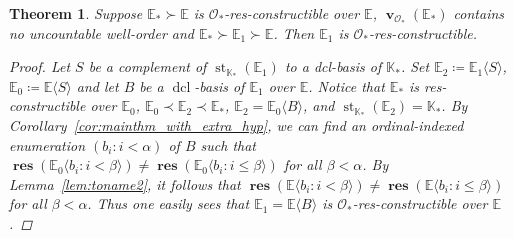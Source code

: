 \documentclass{amsart}
\newtheorem{theorem}{Theorem}
\theoremstyle{remark}
\theoremstyle{definition}
\theoremstyle{plain}
\newcommand{\bE}{\mathbb E}
\newcommand{\bK}{\mathbb K}
\newcommand{\cO}{\mathcal O}
\DeclareMathOperator{\val}{\mathbf{v}}
\DeclareMathOperator{\res}{\mathbf{res}}
\DeclareMathOperator{\std}{\mathrm{st}}
\DeclareMathOperator{\dcl}{\mathrm{dcl}}
\theoremstyle{plain}
\begin{document}
\begin{theorem}\label{thm:mainthm}
    Suppose $\bE_*\succ \bE$ is $\cO_*$-res-constructible over $\bE$, $\val_{\cO_*}(\bE_*)$ contains no uncountable well-order and $\bE_* \succ \bE_1 \succ \bE$. Then $\bE_1$ is $\cO_*$-res-constructible.
    \begin{proof}
        Let $S$ be a complement of $\std_{\bK_*}(\bE_1)$ to a dcl-basis of $\bK_*$. Set $\bE_2\coloneqq \bE_1\langle S\rangle$, $\bE_0\coloneqq \bE \langle S\rangle$ and let $B$ be a $\dcl$-basis of $\bE_1$ over $\bE$. 
        Notice that $\bE_*$ is res-constructible over $\bE_0$, $\bE_0 \prec \bE_2 \prec \bE_*$, $\bE_2=\bE_0 \langle B\rangle$, and $\std_{\bK_*}(\bE_2)=\bK_*$.
        By Corollary~\ref{cor:mainthm_with_extra_hyp}, we can find an ordinal-indexed enumeration $(b_i: i< \alpha)$ of $B$ such that $\res(\bE_0 \langle b_i: i< \beta \rangle)\neq \res(\bE_0 \langle b_i: i\le \beta\rangle)$ for all $\beta <\alpha$.
        By Lemma~\ref{lem:toname2}, it follows that $\res(\bE \langle b_i: i< \beta \rangle)\neq \res(\bE \langle b_i: i\le \beta\rangle)$ for all $\beta <\alpha$. Thus one easily sees that $\bE_1 = \bE \langle B \rangle$ is $\cO_*$-res-constructible over $\bE$.
    \end{proof}
\end{theorem}
\end{document}
